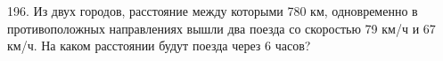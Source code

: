 196. Из двух городов, расстояние между которыми 780 км, одновременно в противоположных направлениях вышли два поезда со скоростью 79 км/ч и 67 км/ч. На каком расстоянии будут поезда через 6 часов?\\
